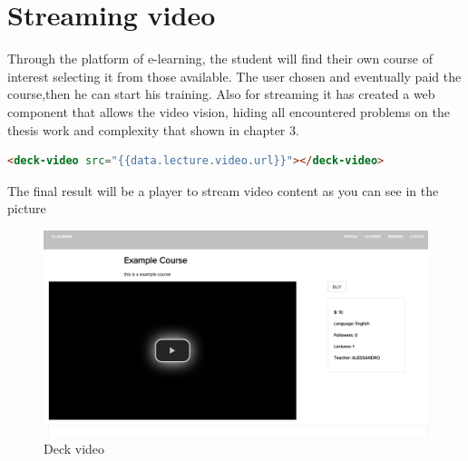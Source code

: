\section{Streaming video}
\label{sec:attend_the_course}

Through the platform of e-learning, the student will find their own course of interest selecting it from those available.
The user chosen and eventually paid the course,then he can start his training.
Also for streaming it has created a web component that allows the video vision, hiding all encountered problems on the thesis work and complexity that shown in chapter 3.

\begin{lstlisting}[language=html]
       <deck-video src="{{data.lecture.video.url}}"></deck-video>
\end{lstlisting}

The final result will be a player to stream video content as you can see in the picture

\begin{figure}[htb]
 \centering
 \includegraphics[width=1.0\linewidth]{images/chapter6/deck_video.png}\hfill
 \caption[Deck video]{Deck video}
 \label{fig:fourV}
\end{figure}
